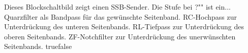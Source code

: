    {Dieses Blockschaltbild zeigt einen SSB-Sender. Die Stufe bei \glqq?"" ist ein...}
    {Quarzfilter als Bandpass für das gewünschte Seitenband.}
    {RC-Hochpass zur Unterdrückung des unteren Seitenbands.}
    {RL-Tiefpass zur Unterdrückung des oberen Seitenbands.}
    {ZF-Notchfilter zur Unterdrückung des unerwünschten Seitenbands.}
    {true}{false}